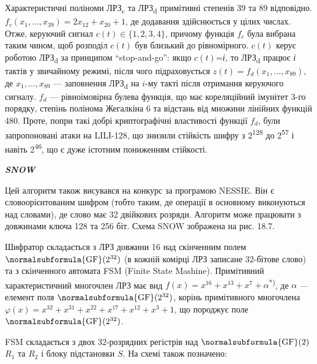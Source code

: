 Характеристичні поліноми ЛРЗ\textsubscript{c} та ЛРЗ\textsubscript{d} примітивні
степенів 39 та 89 відповідно. 
${f_{{c}}(x_{{1}},\dots,x_{{\text{39}}})=2x_{{\text{12}}}+x_{{\text{20}}}+1}$,
де додавання здійснюється у цілих числах. Отже, керуючий сигнал  ${c(t)\in
\{1,2,3,4\}}$, причому функція  ${f_{{c}}}$ була вибрана таким чином, щоб
розподіл  ${c(t)}$ був близький до рівномірного.  ${c(t)}$ керує роботою
ЛРЗ\textsubscript{d} за принципом “stop{}-and{}-go”: якщо  ${c(t)}$=\textit{і,
}то ЛРЗ\textsubscript{d} працює \textit{ і} тактів у звичайному режимі, після
чого  підраховується 
${z(t)=f_{{d}}(x_{{1}},\dots,x_{{\text{89}}}),}$ де 
${x_{{1}},\dots,x_{{\text{89}}}}$ --- заповнення
ЛРЗ\textsubscript{d} на   ${i}${}-му такті після отримання керуючого сигналу. 
${f_{{d}}}$ --- рівноімовірна булева функція, що має кореляційний імунітет 3-го
порядку, степінь полінома Жегалкіна 6 та відстань від множини лінійних функцій
480. Проте, попри такі добрі криптографічні властивості функції  ${f_{{d}}}$,
були запропоновані атаки на LILI{}-128, що знизили стійкість шифру з
2\textsuperscript{128} до 2\textsuperscript{57} і навіть 2\textsuperscript{46},
що є дуже істотним пониженням стійкості.  


\bigskip

{\centering\bfseries\itshape
SNOW
\par}


\bigskip

Цей алгоритм також висувався на конкурс за програмою NESSIE. Він є
словоорієнтованим шифром (тобто таким, де операції в основному виконуються над
словами), де слово має 32 двійкових розряди. Алгоритм може працювати  з
довжинами ключа 128 та 256 біт. Схема SNOW зображена на рис. 18.7.

Шифратор складається з ЛРЗ довжини 16 над скінченним полем 
${\normalsubformula{\text{GF}}(2^{{\text{32}}})}$ (в кожній комірці ЛРЗ
записане 32-бітове слово) та з скінченного автомата FSM (Finite State Mashine).
Примітивний характеристичний многочлен ЛРЗ  має вид 
${f(x)=x^{{\text{16}}}+x^{{\text{13}}}+x^{{7}}+\alpha }$\textsuperscript{*)},
де  ${\alpha }$ --- елемент поля 
${\normalsubformula{\text{GF}}(2^{{\text{32}}})}$, корінь примітивного
многочлена  ${\varphi
(x)=x^{{\text{32}}}+x^{{\text{31}}}+x^{{\text{22}}}+x^{{\text{17}}}+x^{{\text{12}}}+x^{{3}}+1}$,
що породжує поле  ${\normalsubformula{\text{GF}}(2^{{\text{32}}})}$.

FSM складається з двох 32-розрядних регістрів над 
${\normalsubformula{\text{GF}}(2)}$  ${R_{{1}}}$ та  ${R_{{2}}}$ і блоку
підстановки  ${S}$. На схемі також позначено: 

